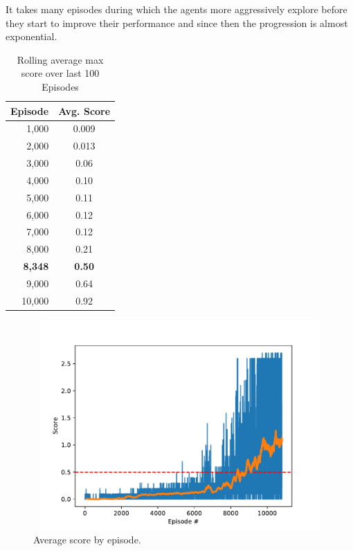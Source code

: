 \documentclass[pagenumber=off]{article}
\begin{document}
It takes many episodes during which the agents more aggressively explore before they start to improve their performance and since then the progression is almost exponential.  

\begin{table}[h]
  \centering
    \begin{tabular}{|r|c|}
      \hline
      {\bf Episode} & {\bf Avg. Score} \\ 
      \hline
      1,000  & 0.009\\ 
      2,000  & 0.013\\
      3,000  & 0.06 \\
      4,000  & 0.10 \\
      5,000  & 0.11 \\
      6,000  & 0.12 \\
      7,000  & 0.12 \\
      8,000  & 0.21 \\
      {\bf 8,348}  & {\bf 0.50} \\
      9,000  & 0.64 \\
      10,000 & 0.92 \\
      \hline
    \end{tabular}
    \caption{Rolling average max score over last 100 Episodes}
  \end{table}

\vspace{0cm}
\begin{figure}[!h]
  \centerline{\includegraphics[page=1, height=8cm, width=14cm, angle=0]{./Plots/Average_Score.pdf}}
  \caption{Average score by episode.}
\end{figure}

\end{document}
